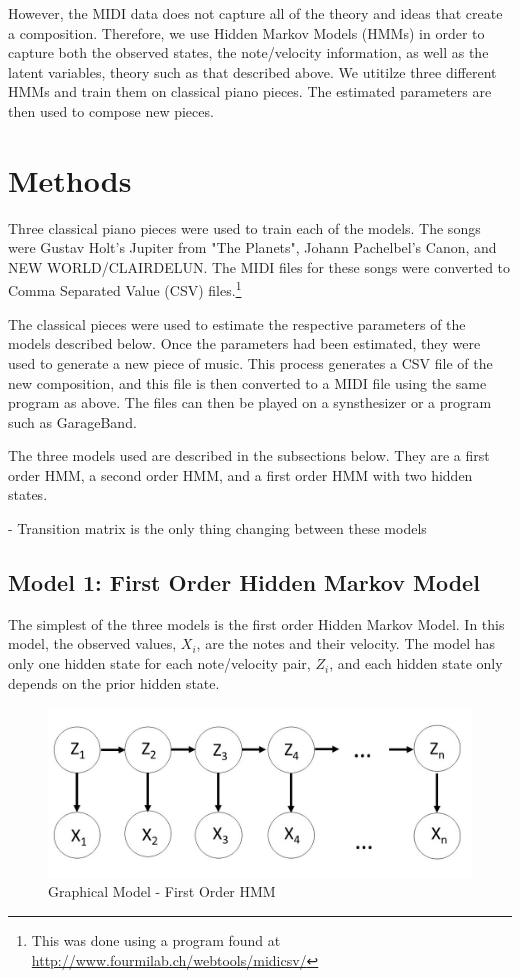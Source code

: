 \documentclass{article} %
\begin{document}
However, the MIDI data does not capture all of the theory and ideas that create a composition. Therefore, we use Hidden Markov Models (HMMs) in order to capture both the observed states, the note/velocity information, as well as the latent variables, theory such as that described above. We utitilze three different HMMs and train them on classical piano pieces. The estimated parameters are then used to compose new pieces.


\section{Methods}

Three classical piano pieces were used to train each of the models. The songs were Gustav Holt's Jupiter from "The Planets", Johann Pachelbel's Canon, and NEW WORLD/CLAIRDELUN. The MIDI files for these songs were converted to Comma Separated Value (CSV) files.\footnote{This was done using a program found at \url{http://www.fourmilab.ch/webtools/midicsv/}} 

The classical pieces were used to estimate the respective parameters of the models described below. Once the parameters had been estimated, they were used to generate a new piece of music. This process generates a CSV file of the new composition, and this file is then converted to a MIDI file using the same program as above. The files can then be played on a synsthesizer or a program such as GarageBand.

The three models used are described in the subsections below. They are a first order HMM, a second order HMM, and a first order HMM with two hidden states. 

- Transition matrix is the only thing changing between these models

\subsection {Model 1: First Order Hidden Markov Model}

The simplest of the three models is the first order Hidden Markov Model. In this model, the observed values, $X_i$, are the notes and their velocity. The model has only one hidden state for each note/velocity pair, $Z_i$, and each hidden state only depends on the prior hidden state. 

\begin{figure}[H]
\centering
\caption{Graphical Model - First Order HMM}
\includegraphics [scale = 0.35] {Model1.jpg}
\end{figure}
\end{document}
